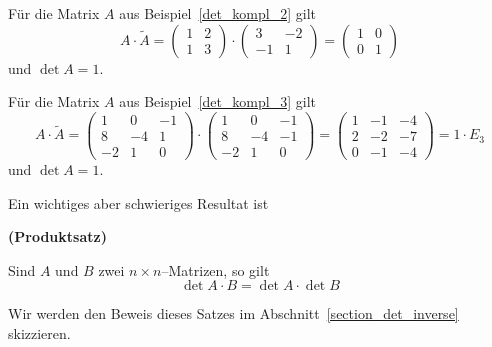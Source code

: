 \medbreak

\begin{beispiel} Für die Matrix $A$ aus Beispiel~\ref{det_kompl_2} gilt
  	$$ A \cdot \widetilde{A} = \left( \begin{matrix} 1 & 2 \\ 1 & 3 \end{matrix} \right)
  	\cdot \left( \begin{matrix} 3 & -2 \\ -1 & 1 \end{matrix} \right)
  	= \left( \begin{matrix} 1 & 0 \\ 0 & 1 \end{matrix} \right) $$
und $\det{A} = 1$.
\end{beispiel}

\begin{beispiel} Für die Matrix $A$ aus Beispiel~\ref{det_kompl_3} gilt
  	$$ A \cdot \widetilde{A} =  \left( \begin{matrix} 1 & 0 & -1 \\ 8 & -4 & 1 \\ 
   	-2 & 1 & 0 \end{matrix} \right) \cdot 
   	\left( \begin{matrix} 1 & 0 & -1 \\ 8 & -4 & -1 \\ -2 & 1 & 0 \end{matrix} \right) =
  	\left( \begin{matrix} 1 & -1 & -4 \\ 2 & -2 & -7 \\ 0 & -1 & -4 \end{matrix} \right) = 1 \cdot E_3  $$ 
und $\det{A} = 1$.           
\end{beispiel}
\bigbreak

Ein wichtiges aber schwieriges Resultat ist 

\begin{satz}\label{det_n_produkt} \textbf{(Produktsatz)} 

Sind $A$ und  $B$ zwei $n \times n$--Matrizen, so gilt
  	$$ \det{ A \cdot B } = \det{A} \cdot \det{B} $$
\end{satz}

Wir werden den Beweis dieses Satzes im Abschnitt~\ref{section_det_inverse} 
skizzieren.

\bigbreak

